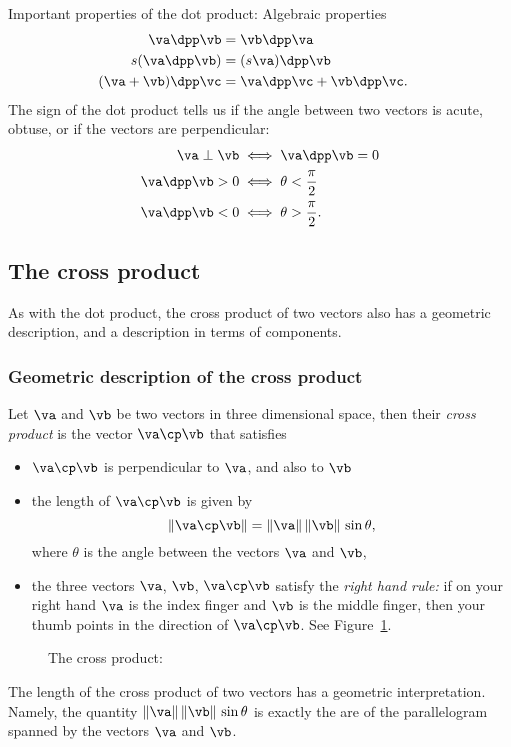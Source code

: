 Important properties of the dot product:
Algebraic properties
\begin{align*}
  \va\dpp\vb &= \vb\dpp\va & \\
  s(\va\dpp\vb) &= (s\va)\dpp\vb & \\
  (\va+\vb)\dpp\vc & = \va\dpp\vc + \vb\dpp\vc.
\end{align*}
The sign of the dot product tells us if the angle between two vectors is acute,
obtuse, or if the vectors are perpendicular:
\begin{subequations}
  \begin{align}
    \va\perp\vb  &\iff \va\dpp\vb=0 \\
    \va\dpp\vb>0 &\iff \theta<\frac{\pi}{2}\\
    \va\dpp\vb<0 &\iff \theta>\frac{\pi}{2}.
  \end{align}
\end{subequations}

\subsection{The cross product} %
As with the dot product, the cross product of two vectors also has a geometric
description, and a description in terms of components.

\subsubsection*{Geometric description of the cross product} Let $\va$ and $\vb$ be
two vectors in three dimensional space, then their \emph{cross product} is the vector
$\va\cp\vb$ that satisfies
\begin{itemize}
\item $\va\cp\vb$ is perpendicular to $\va$, and also to $\vb$
\item the length of $\va\cp\vb$ is given by 
  \[
    \|\va\cp\vb\| = \|\va\|\,\|\vb\|\,\sin\theta,
  \]
  where $\theta$ is the angle between the vectors $\va$ and $\vb$,
\item the three vectors $\va$, $\vb$, $\va\cp\vb$ satisfy the \emph{right hand rule:}
  if on your right hand $\va$ is the index finger and $\vb$ is the middle finger,
  then your thumb points in the direction of $\va\cp\vb$.  See
  Figure~\ref{fig:cross-product}.
\end{itemize}
\begin{figure}[t]
  
  \caption{The cross product:  }
  \label{fig:cross-product}
\end{figure}
The length of the cross product of two vectors has a geometric interpretation.
Namely, the quantity $\|\va\|\,\|\vb\|\,\sin\theta$ is exactly the are of the
parallelogram spanned by the vectors $\va$ and $\vb$.
\begin{figure}[h]
  
\end{figure}

